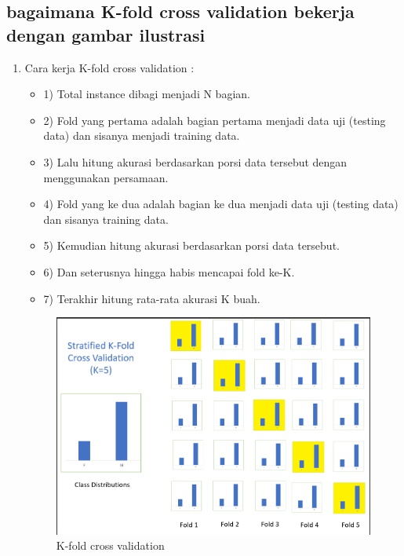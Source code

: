 \subsection{bagaimana K-fold cross validation bekerja dengan gambar ilustrasi}
\begin{enumerate}
\item Cara kerja K-fold cross validation :
\begin{itemize}
\item 1)	Total instance dibagi menjadi N bagian.
\item 2)	Fold yang pertama adalah bagian pertama menjadi data uji (testing data) dan sisanya menjadi training data.
\item 3)	Lalu hitung akurasi berdasarkan porsi data tersebut dengan menggunakan persamaan.
\item 4)	Fold yang ke dua adalah bagian ke dua menjadi data uji (testing data) dan sisanya training data. 
\item 5)	Kemudian hitung akurasi berdasarkan porsi data tersebut.
\item 6)	Dan seterusnya hingga habis mencapai fold ke-K.
\item 7)	Terakhir hitung rata-rata akurasi K buah.
\end{itemize}
\begin{figure}[ht]
\centering
\includegraphics[scale=0.5]{figures/wiendh5.png}
\caption{K-fold cross validation }
\label{contoh}
\end{figure}
\end{enumerate}

